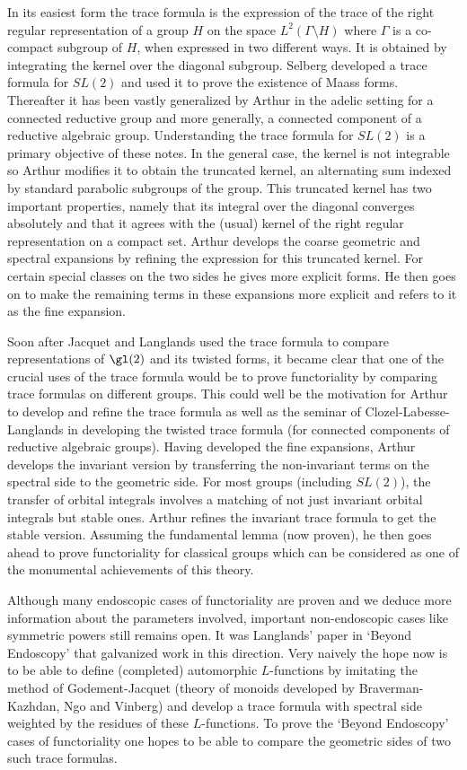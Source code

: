 \documentclass[11pt]{amsart}
\def\bs{\setminus}
\def\Ltwo{L^2}
\theoremstyle{remark}
\begin{document}
	In its easiest form the trace formula is the expression of the trace of the right regular representation of a group $H$ on the space $\Ltwo(\Gamma\bs H)$ where $\Gamma$ is a co-compact subgroup of $H$, when expressed in two different ways. It is obtained by integrating the kernel over the diagonal subgroup. Selberg developed a trace formula for $SL(2)$ and used it to prove the existence of Maass forms. Thereafter it has been vastly generalized by Arthur in the adelic setting for a connected reductive group and more generally, a connected component of a reductive algebraic group. Understanding the trace formula for $SL(2)$ is a primary objective of these notes. In the general case, the kernel is not integrable so Arthur modifies it to obtain the truncated kernel, an alternating sum indexed by standard parabolic subgroups of the group. This truncated kernel has two important properties, namely that its integral over the diagonal converges absolutely and that it agrees with the (usual) kernel of the right regular representation on a compact set. Arthur develops the coarse geometric and spectral expansions by refining the expression for this truncated kernel. For certain special classes on the two sides he gives more explicit forms. He then goes on to make the remaining terms in these expansions more explicit and refers to it as the fine expansion. 
	
	Soon after Jacquet and Langlands \cite{MR0401654} used the trace formula to compare representations of $\gl(2)$ and its twisted forms, it became clear that one of the crucial uses of the trace formula would be to prove functoriality by comparing trace formulas on different groups. This could well be the motivation for Arthur to develop and refine the trace formula as well as the seminar of Clozel-Labesse-Langlands in developing the twisted trace formula (for connected components of reductive algebraic groups). Having developed the fine expansions, Arthur develops the invariant version by transferring the non-invariant terms on the spectral side to the geometric side. For most groups (including $SL(2)$), the transfer of orbital integrals involves a matching of not just invariant orbital integrals but stable ones. Arthur refines the invariant trace formula to get the stable version. Assuming the fundamental lemma (now proven), he then goes ahead to prove functoriality for classical groups which can be considered as one of the monumental achievements of this theory. 

	Although many endoscopic cases of functoriality are proven and we deduce more information about the parameters involved, important non-endoscopic cases like symmetric powers still remains open. It was Langlands' paper in `Beyond Endoscopy' \cite{MR2058622} that galvanized work in this direction. Very naively the hope now is to be able to define (completed) automorphic $L$-functions by imitating the method of Godement-Jacquet (theory of monoids developed by Braverman-Kazhdan, Ngo and Vinberg) and develop a trace formula with spectral side weighted by the residues of these $L$-functions. To prove the `Beyond Endoscopy' cases of functoriality one hopes to be able to compare the geometric sides of two such trace formulas. 
	
\end{document}
